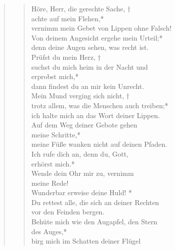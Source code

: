 \begin{quote}
\begin{verse}


\smallskip

Höre, Herr, die gerechte Sache, †\\
achte auf mein Flehen,*\\
vernimm mein Gebet von Lippen ohne Falsch!\\ \vin
Von deinem Angesicht ergehe mein Urteil;*\\ \vin
denn deine Augen sehen, was recht ist.\\
Prüfst du mein Herz, †\\
 suchst du mich heim in der Nacht und\\ erprobst mich,*\\
dann findest du an mir kein Unrecht.\\ \vin
Mein Mund verging sich nicht, †\\ \vin
trotz allem, was die Menschen auch treiben;*\\ \vin
ich halte mich an das Wort deiner Lippen.\\
Auf dem Weg deiner Gebote gehen\\ meine Schritte,*\\
meine Füße wanken nicht auf deinen Pfaden.\\ \vin
Ich rufe dich an, denn du, Gott, \\ \vin erhörst mich.*\\ \vin
Wende dein Ohr mir zu, vernimm\\ \vin  meine Rede!\\
Wunderbar erweise deine Huld! *\\
Du rettest alle, die sich an deiner Rechten\\ vor den Feinden bergen.\\ \vin
Behüte mich wie den Augapfel, den Stern\\ \vin  des Auges,*\\ \vin
birg mich im Schatten deiner Flügel\\


\end{verse}
\end{quote}
